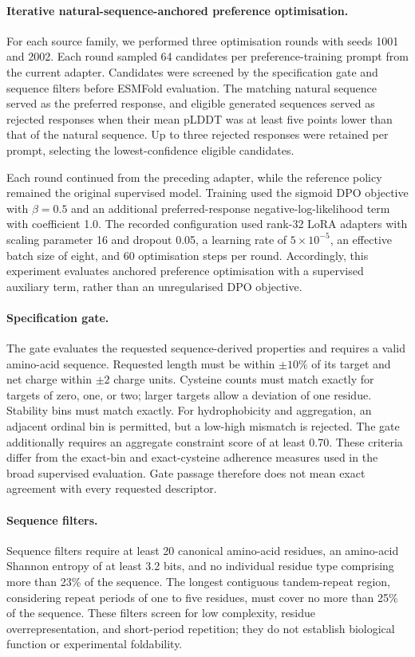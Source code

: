 \documentclass{article} %
\begin{document}
\paragraph{Iterative natural-sequence-anchored preference optimisation.}
For each source family, we performed three optimisation rounds
with seeds 1001 and 2002. Each round sampled 64 candidates per
preference-training prompt from the current adapter. Candidates
were screened by the specification gate and sequence filters
before ESMFold evaluation. The matching natural sequence served
as the preferred response, and eligible generated sequences
served as rejected responses when their mean pLDDT was at least
five points lower than that of the natural sequence. Up to
three rejected responses were retained per prompt, selecting
the lowest-confidence eligible candidates.

Each round continued from the preceding adapter, while the
reference policy remained the original supervised model.
Training used the sigmoid DPO objective with $\beta=0.5$ and
an additional preferred-response negative-log-likelihood term
with coefficient 1.0. The recorded configuration used
rank-32 LoRA adapters with scaling parameter 16 and dropout
0.05, a learning rate of $5\times10^{-5}$, an effective batch
size of eight, and 60 optimisation steps per round.
Accordingly, this experiment evaluates anchored preference
optimisation with a supervised auxiliary term, rather than
an unregularised DPO objective.

\paragraph{Specification gate.}
The gate evaluates the requested sequence-derived properties and requires a valid amino-acid sequence. Requested length must be within $\pm10\%$ of its target and net charge within $\pm2$ charge units. Cysteine counts must match exactly for targets of zero, one, or two; larger targets allow a deviation of one residue. Stability bins must match exactly. For hydrophobicity and aggregation, an adjacent ordinal bin is permitted, but a low-high mismatch is rejected. The gate additionally requires an aggregate constraint score of at least 0.70. These criteria differ from the exact-bin and exact-cysteine adherence measures used in the broad supervised evaluation. Gate passage therefore does not mean exact agreement with every requested descriptor.

\paragraph{Sequence filters.}
Sequence filters require at least 20 canonical amino-acid residues, an amino-acid Shannon entropy of at least 3.2 bits, and no individual residue type comprising more than 23\% of the sequence. The longest contiguous tandem-repeat region, considering repeat periods of one to five residues, must cover no more than 25\% of the sequence. These filters screen for low complexity, residue overrepresentation, and short-period repetition; they do not establish biological function or experimental foldability.
\end{document}
